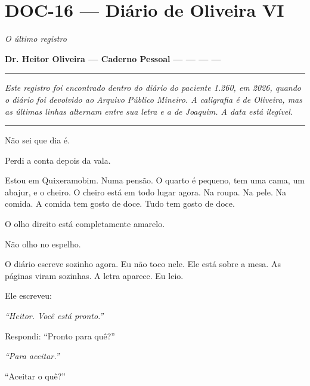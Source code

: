 \section*{\textbf{DOC-16} --- Diário de Oliveira VI}

\noindent \textit{O último registro}

\noindent \textbf{Dr. Heitor Oliveira --- Caderno Pessoal}
\textbf{--- --- --- ---}

\vspace{0.5em}\noindent\rule{\textwidth}{0.5pt}\vspace{0.5em}

\noindent \textit{Este registro foi encontrado dentro do diário do paciente 1.260, em 2026, quando o diário foi devolvido ao Arquivo Público Mineiro. A caligrafia é de Oliveira, mas as últimas linhas alternam entre sua letra e a de Joaquim. A data está ilegível.}

\vspace{0.5em}\noindent\rule{\textwidth}{0.5pt}\vspace{0.5em}

\noindent Não sei que dia é.

\noindent Perdi a conta depois da vala.

\noindent Estou em Quixeramobim. Numa pensão. O quarto é pequeno, tem uma cama, um abajur, e o cheiro. O cheiro está em todo lugar agora. Na roupa. Na pele. Na comida. A comida tem gosto de doce. Tudo tem gosto de doce.

\noindent O olho direito está completamente amarelo.

\noindent Não olho no espelho.

\noindent O diário escreve sozinho agora. Eu não toco nele. Ele está sobre a mesa. As páginas viram sozinhas. A letra aparece. Eu leio.

\noindent Ele escreveu:

\noindent \textit{\textquotedblleft{}Heitor. Você está pronto.\textquotedblright{}}

\noindent Respondi: \textquotedblleft{}Pronto para quê?\textquotedblright{}

\noindent \textit{\textquotedblleft{}Para aceitar.\textquotedblright{}}

\noindent \textquotedblleft{}Aceitar o quê?\textquotedblright{}

